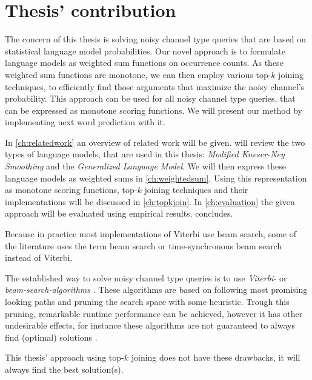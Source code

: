 \section{Thesis' contribution}

The concern of this thesis is solving noisy channel type queries that are based
on statistical language model probabilities.
Our novel approach is to formulate language models as weighted sum functions on
occurrence counts.
As these weighted sum functions are monotone, we can then employ various
top-$k$ joining techniques, to efficiently find those arguments that maximize
the noisy channel's probability.
This approach can be used for all noisy channel type queries, that can be
expressed as monotone scoring functions.
We will present our method by implementing next word prediction with it.

In \cref{ch:relatedwork} an overview of related work will be given.
 will review the two types of language models, that are used in
this thesis: \emph{Modified Kneser-Ney Smoothing} and the \emph{Generalized
Language Model}.
We will then express these language models as weighted sums in
\cref{ch:weightedsum}.
Using this representation as monotone scoring functions, top-$k$ joining
techniques and their implementations will be discussed in \cref{ch:topkjoin}.
In \cref{ch:evaluation} the given approach will be evaluated using empirical
results.
 concludes.

\begin{draft}
\begin{displayquote}
Because in practice most implementations of Viterbi use beam
search, some of the literature uses the term beam search or time-synchronous beam
search instead of Viterbi.
\end{displayquote}
\end{draft}

The established way to solve noisy channel type queries is to use
\emph{Viterbi-} or \emph{beam-search-algorithms}
\parencite{JurafskyMartin2009,Bickel2005}.
These algorithms are based on following most promising looking paths and
pruning the search space with some heuristic.
Trough this pruning, remarkable runtime performance can be achieved, however it
has other undesirable effects, for instance these algorithms are not guaranteed
to always find (optimal) solutions \parencite{Bickel2005}.

This thesis' approach using top-$k$ joining does not have these drawbacks, it
will always find the best solution(s).
